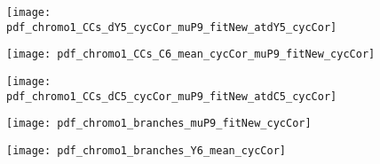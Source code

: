 
\begin{figure}
	\centering
	\texttt{[image: pdf\_chromo1\_CCs\_dY5\_cycCor\_muP9\_fitNew\_atdY5\_cycCor]}
	\clearpage %
	\label{fig:XXX:XXX}
\end{figure}	

\clearpage



\begin{figure}
	\centering
	\texttt{[image: pdf\_chromo1\_CCs\_C6\_mean\_cycCor\_muP9\_fitNew\_cycCor]}
	\clearpage %
	\label{fig:XXX:XXX}
\end{figure}	

\clearpage



\begin{figure}
	\centering
	\texttt{[image: pdf\_chromo1\_CCs\_dC5\_cycCor\_muP9\_fitNew\_atdC5\_cycCor]}
	\clearpage %
	\label{fig:XXX:XXX}
\end{figure}	

\clearpage



\begin{figure}
	\centering
	\texttt{[image: pdf\_chromo1\_branches\_muP9\_fitNew\_cycCor]}
	\clearpage %
	\label{fig:XXX:XXX}
\end{figure}	

\clearpage



\begin{figure}
	\centering
	\texttt{[image: pdf\_chromo1\_branches\_Y6\_mean\_cycCor]}
	\clearpage %
	\label{fig:XXX:XXX}
\end{figure}	

